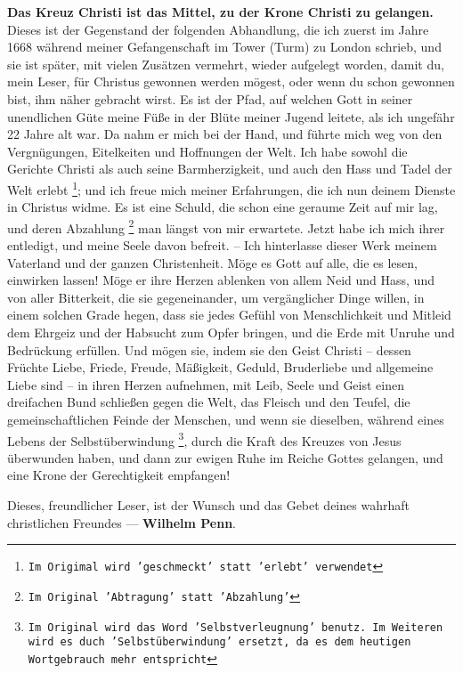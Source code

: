 \textbf{Das Kreuz Christi ist das Mittel, zu der Krone Christi zu gelangen.}
Dieses ist der Gegenstand der folgenden Abhandlung, die ich zuerst im Jahre 1668
während meiner Gefangenschaft  im Tower (Turm) zu London  schrieb, und sie ist später, mit vielen Zusätzen vermehrt, wieder
aufgelegt worden, damit du, mein Leser, für Christus gewonnen werden mögest,
oder wenn du schon gewonnen bist, ihm näher gebracht wirst. Es ist der Pfad, auf
welchen Gott in seiner unendlichen Güte meine Füße in der Blüte meiner Jugend
leitete, als ich ungefähr 22 Jahre alt war. Da nahm er mich bei der Hand, und
führte mich weg von den Vergnügungen, Eitelkeiten und Hoffnungen der Welt. Ich
habe sowohl die Gerichte Christi als auch seine Barmherzigkeit, und auch den
Hass und Tadel der Welt erlebt \footnote{\texttt{Im Origimal wird 'geschmeckt' statt 'erlebt' verwendet}}; und ich freue mich meiner Erfahrungen, die ich nun deinem
Dienste in Christus widme. Es ist eine Schuld, die schon eine geraume Zeit auf
mir lag, und deren Abzahlung \footnote{\texttt{Im Original 'Abtragung' statt
'Abzahlung'}} man längst von mir erwartete. Jetzt habe ich mich ihrer
entledigt, und meine Seele davon befreit. -- Ich hinterlasse dieser Werk meinem
Vaterland und der ganzen Christenheit. Möge es Gott auf alle, die es lesen,
einwirken lassen! Möge er ihre Herzen ablenken von allem Neid und Hass, und von
aller Bitterkeit, die sie gegeneinander, um vergänglicher Dinge willen, in
einem solchen Grade hegen, dass sie jedes Gefühl von Menschlichkeit und Mitleid
dem Ehrgeiz und der Habsucht zum Opfer bringen, und die Erde mit Unruhe und
Bedrückung erfüllen. Und mögen sie, indem sie den Geist Christi -- dessen
Früchte Liebe, Friede, Freude, Mäßigkeit, Geduld, Bruderliebe und allgemeine
Liebe sind -- in ihren Herzen aufnehmen, mit Leib, Seele und Geist einen
dreifachen Bund schließen gegen die Welt, das Fleisch und den Teufel, die
gemeinschaftlichen Feinde der Menschen, und wenn sie dieselben, während eines
Lebens der Selbstüberwindung \footnote{\texttt{Im Original wird das Word
'Selbstverleugnung' benutz. Im Weiteren wird es duch 'Selbstüberwindung'
ersetzt, da es dem heutigen Wortgebrauch mehr entspricht}}, durch die Kraft des
Kreuzes von Jesus überwunden haben, und dann zur ewigen Ruhe im Reiche Gottes
gelangen, und eine Krone der Gerechtigkeit empfangen!


\medskip

Dieses, freundlicher Leser, ist der Wunsch und das Gebet deines wahrhaft
christlichen Freundes --- \textbf{Wilhelm Penn}.
